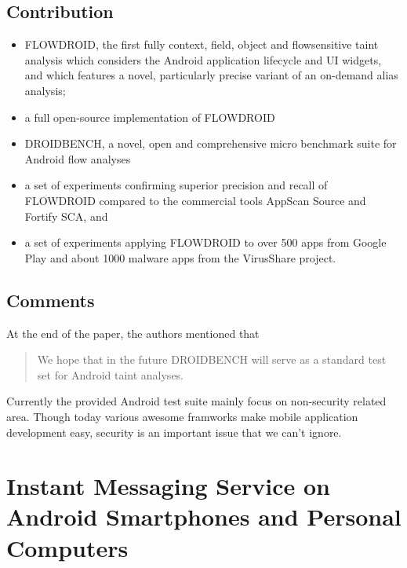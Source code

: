 \documentclass[a4paper]{article}
\begin{document}
    \subsection{Contribution}
      \begin{itemize}
        \item F\textsc{LOW}D\textsc{ROID}, the first fully context, field, object and flowsensitive taint analysis which considers the Android application lifecycle and UI widgets, and which features a novel, particularly precise variant of an on-demand alias analysis;
        \item a full open-source implementation of F\textsc{LOW}D\textsc{ROID}
        \item D\textsc{ROID}B\textsc{ENCH}, a novel, open and comprehensive micro benchmark suite for Android flow analyses
        \item a set of experiments confirming superior precision and recall of F\textsc{LOW}D\textsc{ROID} compared to the commercial tools AppScan Source and Fortify SCA, and
        \item a set of experiments applying FLOWDROID to over 500 apps from Google Play and about 1000 malware apps from the VirusShare project.
      \end{itemize}
    \subsection{Comments}
      At the end of the paper, the authors mentioned that
      \begin{quote}
        We hope that in the future DROIDBENCH will serve as a standard test set for Android taint analyses.
      \end{quote}
      Currently the provided Android test suite mainly focus on non-security related area. Though today various awesome framworks make mobile application development easy, security is an important issue that we can't ignore.

  \section{Instant Messaging Service on Android Smartphones and Personal Computers}
\end{document}
